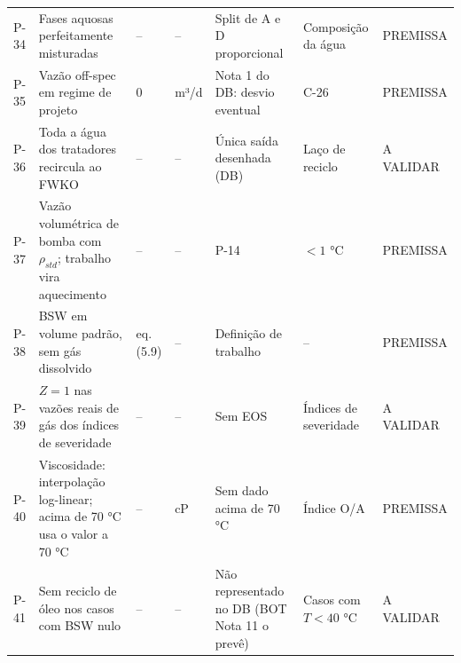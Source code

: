 \documentclass[11pt,a4paper]{article}
\numberwithin{equation}{section}
\numberwithin{table}{section}
\numberwithin{figure}{section}
\newcommand{\tipo}[1]{\textsf{\footnotesize #1}}
\newcommand{\AV}{\textcolor{red!70!black}{\tipo{A VALIDAR}}}
\begin{document}
\begin{landscape}
\begin{longtable}{lL{5.2cm}L{2.4cm}lL{5.4cm}L{4.0cm}l}
P-34 & Fases aquosas perfeitamente misturadas & -- & -- & Split de A e D proporcional & Composição da água & \tipo{PREMISSA}\\
P-35 & Vazão off-spec em regime de projeto & 0 & m³/d & Nota 1 do DB: desvio eventual & C-26 & \tipo{PREMISSA}\\
P-36 & Toda a água dos tratadores recircula ao FWKO & -- & -- & Única saída desenhada (DB) & Laço de reciclo & \AV\\
P-37 & Vazão volumétrica de bomba com $\rho_{std}$; trabalho vira aquecimento & -- & -- & P-14 & $<1$ °C & \tipo{PREMISSA}\\
P-38 & BSW em volume padrão, sem gás dissolvido & eq. (5.9) & -- & Definição de trabalho & -- & \tipo{PREMISSA}\\
P-39 & $Z=1$ nas vazões reais de gás dos índices de severidade & -- & -- & Sem EOS & Índices de severidade & \AV\\
P-40 & Viscosidade: interpolação log-linear; acima de 70 °C usa o valor a 70 °C & -- & cP & Sem dado acima de 70 °C & Índice O/A & \tipo{PREMISSA}\\
P-41 & Sem reciclo de óleo nos casos com BSW nulo & -- & -- & Não representado no DB (BOT Nota 11 o prevê) & Casos com $T<40$ °C & \AV\\
\bottomrule\end{longtable}
\end{landscape}
\end{document}
